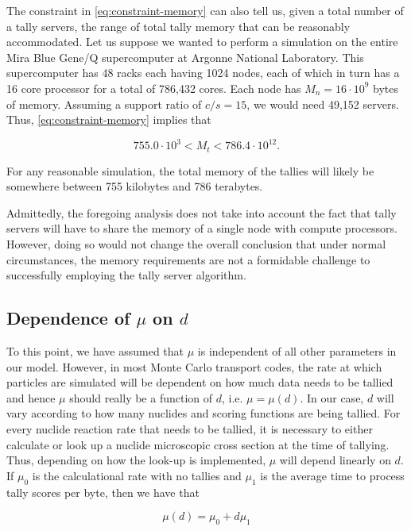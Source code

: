 \documentclass[3p]{elsarticle}
\begin{document}
The constraint in \eqref{eq:constraint-memory} can also tell us, given a total
number of a tally servers, the range of total tally memory that can be
reasonably accommodated. Let us suppose we wanted to perform a simulation on the
entire Mira Blue Gene/Q supercomputer at Argonne National Laboratory. This
supercomputer has 48 racks each having 1024 nodes, each of which in turn has a
16 core processor for a total of 786,432 cores. Each node has $M_n = 16 \cdot
10^9$ bytes of memory. Assuming a support ratio of $c/s = 15$, we would need
49,152 servers. Thus, \eqref{eq:constraint-memory} implies that

\begin{equation}
  \label{eq:constraint-mira}
  755.0 \cdot 10^3 < M_t < 786.4 \cdot 10^{12}.
\end{equation}

\noindent For any reasonable simulation, the total memory of the tallies will
likely be somewhere between 755 kilobytes and 786 terabytes.

Admittedly, the foregoing analysis does not take into account the fact that
tally servers will have to share the memory of a single node with compute
processors. However, doing so would not change the overall conclusion that under
normal circumstances, the memory requirements are not a formidable challenge to
successfully employing the tally server algorithm.

\subsection{Dependence of $\mu$ on $d$}

To this point, we have assumed that $\mu$ is independent of all other parameters
in our model. However, in most Monte Carlo transport codes, the rate at which
particles are simulated will be dependent on how much data needs to be tallied
and hence $\mu$ should really be a function of $d$, i.e. $\mu = \mu(d)$. In our
case, $d$ will vary according to how many nuclides and scoring functions are
being tallied. For every nuclide reaction rate that needs to be tallied, it is
necessary to either calculate or look up a nuclide microscopic cross section at
the time of tallying. Thus, depending on how the look-up is implemented, $\mu$
will depend linearly on $d$. If $\mu_0$ is the calculational rate with no
tallies and $\mu_1$ is the average time to process tally scores per byte, then
we have that

\begin{equation}
  \label{eq:mu-function}
  \mu(d) = \mu_0 + d\mu_1
\end{equation}
\end{document}
